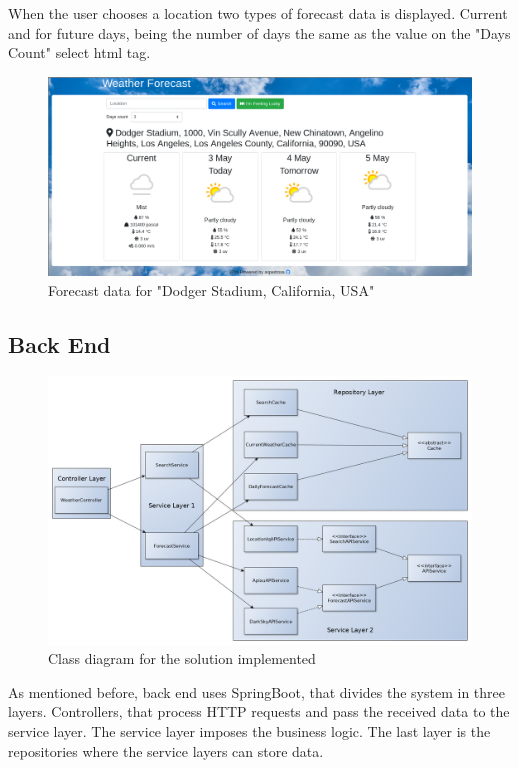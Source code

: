 \documentclass[12pt]{article}
\begin{document}
When the user chooses a location two types of forecast data is displayed. Current and for
  future days, being the number of days the same as the value on the "Days Count" select html tag.

\begin{figure}[h]
  \center
  \includegraphics[scale=0.35]{forecast_data_website.png}
  \caption{Forecast data for "Dodger Stadium, California, USA"}
\end{figure}

\subsection{Back End}

\begin{figure}[h]
  \center
  \includegraphics[scale=0.35]{solution.png}
  \caption{Class diagram for the solution implemented}
  \label{fig_class_diagram}
\end{figure}

As mentioned before, back end uses SpringBoot, that divides the system in three layers. Controllers,
  that process HTTP requests and pass the received data to the service layer. The service layer
  imposes the business logic. The last layer is the repositories where the service layers can store
  data.
\end{document}
